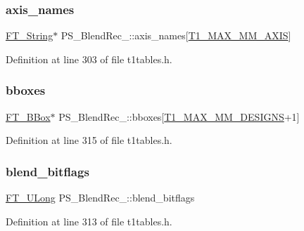 \subsubsection{\texorpdfstring{axis\_names}{axis\_names}}
{\footnotesize\ttfamily \mbox{\hyperlink{fttypes_8h_a9846214585359eb2ba6bbb0e6de30639}{F\+T\+\_\+\+String}}$\ast$ P\+S\+\_\+\+Blend\+Rec\+\_\+\+::axis\+\_\+names\mbox{[}\mbox{\hyperlink{t1tables_8h_a471108ae668a65363dd36bb17e1ecbbe}{T1\+\_\+\+M\+A\+X\+\_\+\+M\+M\+\_\+\+A\+X\+IS}}\mbox{]}}



Definition at line 303 of file t1tables.\+h.

\mbox{\label{struct_p_s___blend_rec___a30845d3cbd2e95a5f9cc867c7226af5e}} 
\subsubsection{\texorpdfstring{bboxes}{bboxes}}
{\footnotesize\ttfamily \mbox{\hyperlink{ftimage_8h_ae341c4eb5a7199947a13b2a1dcaf7af7}{F\+T\+\_\+\+B\+Box}}$\ast$ P\+S\+\_\+\+Blend\+Rec\+\_\+\+::bboxes\mbox{[}\mbox{\hyperlink{t1tables_8h_a933ca229674aa312fd5546fadc95e08f}{T1\+\_\+\+M\+A\+X\+\_\+\+M\+M\+\_\+\+D\+E\+S\+I\+G\+NS}}+1\mbox{]}}



Definition at line 315 of file t1tables.\+h.

\mbox{\label{struct_p_s___blend_rec___a86caa5319e208b4a2057db656bad9221}} 
\subsubsection{\texorpdfstring{blend\_bitflags}{blend\_bitflags}}
{\footnotesize\ttfamily \mbox{\hyperlink{fttypes_8h_a4fac88bdba78eb76b505efa6e4fbf3f5}{F\+T\+\_\+\+U\+Long}} P\+S\+\_\+\+Blend\+Rec\+\_\+\+::blend\+\_\+bitflags}



Definition at line 313 of file t1tables.\+h.

\mbox{\label{struct_p_s___blend_rec___a3ddacbda91fe0f9ef934a9e0afa6286f}} 
